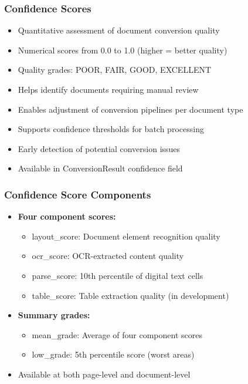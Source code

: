 \begin{frame}[fragile]\frametitle{Confidence Scores}
      \begin{itemize}
	\item Quantitative assessment of document conversion quality
	\item Numerical scores from 0.0 to 1.0 (higher = better quality)
	\item Quality grades: POOR, FAIR, GOOD, EXCELLENT
	\item Helps identify documents requiring manual review
	\item Enables adjustment of conversion pipelines per document type
	\item Supports confidence thresholds for batch processing
	\item Early detection of potential conversion issues
	\item Available in ConversionResult confidence field
	  \end{itemize}
\end{frame}

\begin{frame}[fragile]\frametitle{Confidence Score Components}
      \begin{itemize}
	\item \textbf{Four component scores:}
	\begin{itemize}
		\item layout\_score: Document element recognition quality
		\item ocr\_score: OCR-extracted content quality
		\item parse\_score: 10th percentile of digital text cells
		\item table\_score: Table extraction quality (in development)
	\end{itemize}
	\item \textbf{Summary grades:}
	\begin{itemize}
		\item mean\_grade: Average of four component scores
		\item low\_grade: 5th percentile score (worst areas)
	\end{itemize}
	\item Available at both page-level and document-level
	  \end{itemize}
\end{frame}

